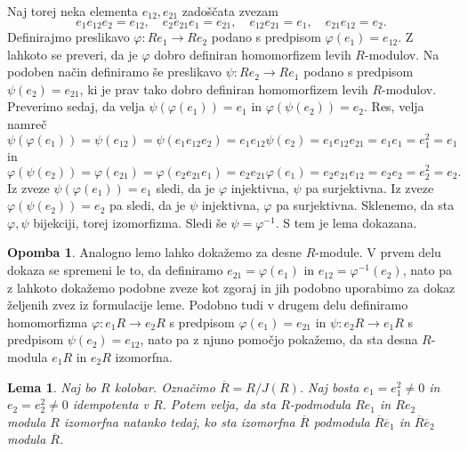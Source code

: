 \documentclass[a4paper, 12pt]{amsart}
\theoremstyle{definition} %
\newtheorem{opomba}[definicija]{Opomba}
\theoremstyle{plain} %
\newtheorem{lema}[definicija]{Lema}
\begin{document}
Naj torej neka elementa $e_{12}, e_{21}$ zadoščata zvezam
$$
e_1 e_{12} e_2 = e_{12}, \quad e_2 e_{21} e_1 = e_{21}, \quad e_{12}e_{21} = e_1, \quad e_{21}e_{12} = e_2.
$$
Definirajmo preslikavo $\varphi : Re_1 \rightarrow Re_2$ podano s predpisom $\varphi(e_1) = e_{12}$. Z lahkoto se preveri, da je $\varphi$ dobro definiran homomorfizem levih $R$-modulov. Na podoben način definiramo še preslikavo $\psi:Re_2 \rightarrow Re_1$ podano s predpisom $\psi(e_2) = e_{21}$, ki je prav tako dobro definiran homomorfizem levih $R$-modulov.
Preverimo sedaj, da velja $\psi(\varphi(e_1)) = e_1$ in $\varphi(\psi(e_2)) = e_2$. Res, velja namreč
$$
\psi(\varphi(e_1)) = \psi(e_{12}) = \psi(e_1 e_{12}e_2) = e_1 e_{12}\psi(e_2) = e_1 e_{12} e_{21} = e_1 e_1 = e_1^2 = e_1
$$
in
$$
\varphi(\psi(e_2)) = \varphi(e_{21}) = \varphi(e_2 e_{21} e_1) = e_2 e_{21} \varphi(e_1) = e_2 e_{21} e_{12} = e_2 e_2 = e_2^2 = e_2. 
$$
Iz zveze $\psi(\varphi(e_1)) = e_1$ sledi, da je $\varphi$ injektivna, $\psi$ pa surjektivna. Iz zveze $\varphi(\psi(e_2)) = e_2$ pa sledi, da je $\psi$ injektivna, $\varphi$ pa surjektivna. Sklenemo, da sta $\varphi, \psi$ bijekciji, torej izomorfizma. Sledi še $\psi = \varphi^{-1}$. S tem je lema dokazana.
\endproof

\begin{opomba} 
Analogno lemo lahko dokažemo za desne $R$-module. V prvem delu dokaza se spremeni le to, da definiramo $e_{21} = \varphi(e_1)$ in $e_{12} = \varphi^{-1} (e_2)$, nato pa z lahkoto dokažemo podobne zveze kot zgoraj in jih podobno uporabimo za dokaz željenih zvez iz formulacije leme. Podobno tudi v drugem delu definiramo homomorfizma $\varphi:e_1 R \rightarrow e_2 R$ s predpisom $\varphi(e_1) = e_{21}$ in $\psi : e_2R \rightarrow e_1 R$ s predpisom $\psi(e_2) = e_{12}$, nato pa z  njuno pomočjo pokažemo, da sta desna $R$-modula $e_1 R$ in $e_2 R$ izomorfna.
\end{opomba}

\begin{lema}
\label{izomorfniPodmoduliKvocient}
Naj bo $R$ kolobar. Označimo $\overline{R} = R/J(R)$. Naj bosta $e_1 = e_1^2 \neq 0$ in $e_2  =  e_2^2 \neq 0 $ idempotenta v $R$. Potem velja, da sta $R$-podmodula $Re_1$ in $Re_2$ modula $R$ izomorfna natanko tedaj, ko sta izomorfna $\overline{R}$ podmodula $ \overline{R}\overline{e}_1$ in $ \overline{R} \overline{e}_2$ modula $\overline{R}$. 
\end{lema}
\end{document}
